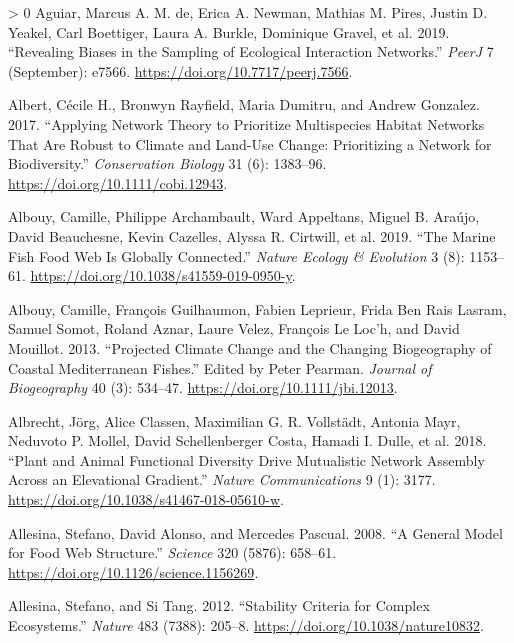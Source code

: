 \documentclass[10pt,oneside]{article}
\newlength{\cslhangindent}
\newenvironment{CSLReferences}[3] %
 {%
  \setlength{\parindent}{0pt}
  \ifodd #1 \everypar{\setlength{\hangindent}{\cslhangindent}}\ignorespaces\fi
  \ifnum #2 > 0
  \setlength{\parskip}{#2\baselineskip}
  \fi
 }%
 {}
\begin{document}
\hypertarget{refs}{}
\begin{CSLReferences}{1}{0}
\leavevmode\hypertarget{ref-deAguiar2019RevBia}{}%
Aguiar, Marcus A. M. de, Erica A. Newman, Mathias M. Pires, Justin D.
Yeakel, Carl Boettiger, Laura A. Burkle, Dominique Gravel, et al. 2019.
{``Revealing Biases in the Sampling of Ecological Interaction
Networks.''} \emph{PeerJ} 7 (September): e7566.
\url{https://doi.org/10.7717/peerj.7566}.

\leavevmode\hypertarget{ref-Albert2017AppNet}{}%
Albert, Cécile H., Bronwyn Rayfield, Maria Dumitru, and Andrew Gonzalez.
2017. {``Applying Network Theory to Prioritize Multispecies Habitat
Networks That Are Robust to Climate and Land-Use Change: Prioritizing a
Network for Biodiversity.''} \emph{Conservation Biology} 31 (6):
1383--96. \url{https://doi.org/10.1111/cobi.12943}.

\leavevmode\hypertarget{ref-Albouy2019MarFis}{}%
Albouy, Camille, Philippe Archambault, Ward Appeltans, Miguel B. Araújo,
David Beauchesne, Kevin Cazelles, Alyssa R. Cirtwill, et al. 2019.
{``The Marine Fish Food Web Is Globally Connected.''} \emph{Nature
Ecology \& Evolution} 3 (8): 1153--61.
\url{https://doi.org/10.1038/s41559-019-0950-y}.

\leavevmode\hypertarget{ref-Albouy2013ProCli}{}%
Albouy, Camille, François Guilhaumon, Fabien Leprieur, Frida Ben Rais
Lasram, Samuel Somot, Roland Aznar, Laure Velez, François Le Loc'h, and
David Mouillot. 2013. {``Projected Climate Change and the Changing
Biogeography of Coastal Mediterranean Fishes.''} Edited by Peter
Pearman. \emph{Journal of Biogeography} 40 (3): 534--47.
\url{https://doi.org/10.1111/jbi.12013}.

\leavevmode\hypertarget{ref-Albrecht2018PlaAni}{}%
Albrecht, Jörg, Alice Classen, Maximilian G. R. Vollstädt, Antonia Mayr,
Neduvoto P. Mollel, David Schellenberger Costa, Hamadi I. Dulle, et al.
2018. {``Plant and Animal Functional Diversity Drive Mutualistic Network
Assembly Across an Elevational Gradient.''} \emph{Nature Communications}
9 (1): 3177. \url{https://doi.org/10.1038/s41467-018-05610-w}.

\leavevmode\hypertarget{ref-Allesina2008GenMod}{}%
Allesina, Stefano, David Alonso, and Mercedes Pascual. 2008. {``A
General Model for Food Web Structure.''} \emph{Science} 320 (5876):
658--61. \url{https://doi.org/10.1126/science.1156269}.

\leavevmode\hypertarget{ref-Allesina2012StaCri}{}%
Allesina, Stefano, and Si Tang. 2012. {``Stability Criteria for Complex
Ecosystems.''} \emph{Nature} 483 (7388): 205--8.
\url{https://doi.org/10.1038/nature10832}.


\end{CSLReferences}
\end{document}
